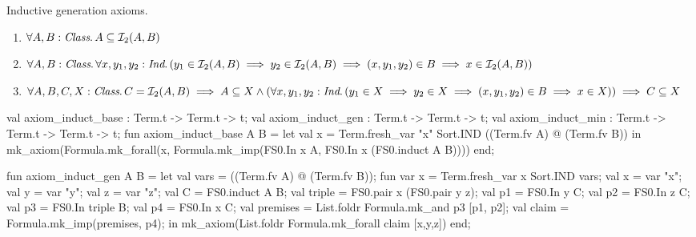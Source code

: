 \begin{node}
Inductive generation axioms.
\begin{enumerate}
  \item $\forall A,B : \textit{Class}\ldotp A\subset \mathcal{I}_{2}(A,B)$
  \item $\forall A,B : \textit{Class}\ldotp\forall
    x,y_{1},y_{2}:\textit{Ind}\ldotp (y_{1}\in \mathcal{I}_{2}(A,B)\implies y_{2}\in
    \mathcal{I}_{2}(A,B)\implies(x,y_{1},y_{2})\in B\implies x\in \mathcal{I}_{2}(A,B))$
  \item $\forall A,B,C,X : \textit{Class}\ldotp
    C=\mathcal{I}_{2}(A,B)\implies A\subset X\land(\forall
    x,y_{1},y_{2}:\textit{Ind}\ldotp (y_{1}\in X\implies y_{2}\in
    X\implies(x,y_{1},y_{2})\in B\implies x\in X))\implies C\subset X$
\end{enumerate}
\end{node}
\nwenddocs{}\plusendmoddef\nwstartdeflinemarkup{}\nwenddeflinemarkup
val axiom_induct_base : Term.t -> Term.t -> t;
val axiom_induct_gen : Term.t -> Term.t -> t;
val axiom_induct_min : Term.t -> Term.t -> Term.t -> t;
\nwendcode{}\nwdocspar
\nwenddocs{}\plusendmoddef\nwstartdeflinemarkup{}\nwenddeflinemarkup
fun axiom_induct_base A B =
  let val x = Term.fresh_var "x" Sort.IND ((Term.fv A) @ (Term.fv B))
  in mk_axiom(Formula.mk_forall(x, Formula.mk_imp(FS0.In x A,
                                                  FS0.In x (FS0.induct A B))))
  end;

fun axiom_induct_gen A B =
  let
    val vars = ((Term.fv A) @ (Term.fv B));
    fun var x = Term.fresh_var x Sort.IND vars;
    val x = var "x";
    val y = var "y";
    val z = var "z";
    val C = FS0.induct A B;
    val triple = FS0.pair x (FS0.pair y z);
    val p1 = FS0.In y C;
    val p2 = FS0.In z C;
    val p3 = FS0.In triple B;
    val p4 = FS0.In x C;
    val premises = List.foldr Formula.mk_and p3 [p1, p2];
    val claim = Formula.mk_imp(premises, p4);
  in
    mk_axiom(List.foldr Formula.mk_forall claim [x,y,z])
  end;

